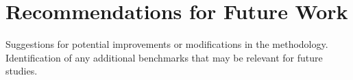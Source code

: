 \section{Recommendations for Future Work}\label{sec:recommendations_for_future_work}
Suggestions for potential improvements or modifications in the methodology.
Identification of any additional benchmarks that may be relevant for future studies.

